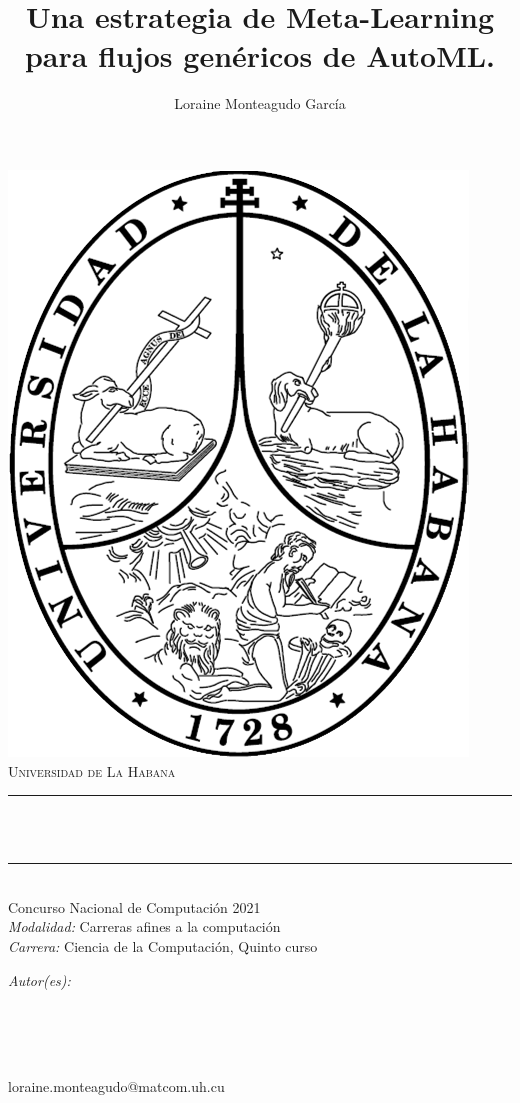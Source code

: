 \documentclass[a4paper,12pt]{article}
\title{Una estrategia de Meta-Learning para flujos genéricos de AutoML.}
\author{Loraine Monteagudo García}
\date{ }
\makeatletter
\newcommand{\role}{loraine.monteagudo@matcom.uh.cu}
\newcommand{\project}{Concurso Nacional de Computación 2021}
\newcommand{\team}{Carreras afines a la computación}
\newcommand{\degree}{Ciencia de la Computación, Quinto curso}
\let\thetitle\@title
\let\theauthor\@author
\makeatother
\begin{document}
\begin{titlepage}
	\centering
    \includegraphics[scale = 0.4]{logo-uh.png}\\[1.0 cm]
    \textsc{\LARGE Universidad de La Habana}\\[1.0 cm]	
	\rule{\linewidth}{0.2 mm} \\[0.4 cm]
	{ \huge \bfseries \thetitle}\\
	\rule{\linewidth}{0.2 mm} \\[1.0 cm]
    \project \ \\
    \emph{Modalidad:}
    \team \\
    \emph{Carrera:}
    \degree \\[1.0 cm]
	
	\begin{minipage}{0.4\textwidth}
		\begin{flushleft} \large
			\emph{Autor(es):}\\
			\theauthor \\
			\end{flushleft}
			\end{minipage}~
			\begin{minipage}{0.4\textwidth}
			\begin{flushright} \large
			\emph{} \\
			\role
		\end{flushright}
	\end{minipage}\\[1.0 cm]
	

\end{titlepage}
\end{document}
